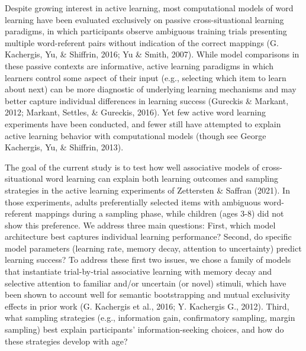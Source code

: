 \documentclass[10pt, letterpaper]{article}
\begin{document}
Despite growing interest in active learning, most computational models
of word learning have been evaluated exclusively on passive
cross-situational learning paradigms, in which participants observe
ambiguous training trials presenting multiple word-referent pairs
without indication of the correct mappings (G. Kachergis, Yu, \&
Shiffrin, 2016; Yu \& Smith, 2007). While model comparisons in these
passive contexts are informative, active learning paradigms in which
learners control some aspect of their input (e.g., selecting which item
to learn about next) can be more diagnostic of underlying learning
mechanisms and may better capture individual differences in learning
success (Gureckis \& Markant, 2012; Markant, Settles, \& Gureckis,
2016). Yet few active word learning experiments have been conducted, and
fewer still have attempted to explain active learning behavior with
computational models (though see George Kachergis, Yu, \& Shiffrin,
2013).

The goal of the current study is to test how well associative models of
cross-situational word learning can explain both learning outcomes and
sampling strategies in the active learning experiments of Zettersten \&
Saffran (2021). In those experiments, adults preferentially selected
items with ambiguous word-referent mappings during a sampling phase,
while children (ages 3-8) did not show this preference. We address three
main questions: First, which model architecture best captures individual
learning performance? Second, do specific model parameters (learning
rate, memory decay, attention to uncertainty) predict learning success?
To address these first two issues, we chose a family of models that
instantiate trial-by-trial associative learning with memory decay and
selective attention to familiar and/or uncertain (or novel) stimuli,
which have been shown to account well for semantic bootstrapping and
mutual exclusivity effects in prior work (G. Kachergis et al., 2016; Y.
Kachergis G., 2012). Third, what sampling strategies (e.g., information
gain, confirmatory sampling, margin sampling) best explain participants'
information-seeking choices, and how do these strategies develop with
age?
\end{document}
